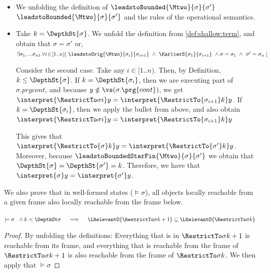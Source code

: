 \begin{itemize}
\item

We unfolding the definition of $\leadstoBounded  {\Mtwo}  {\sigma}  {\sigma'}$  $\leadstoBounded  {\Mtwo}  {\sigma}  {\sigma'}$ and the rules of the operational semantics. 
\item
Take $k=\DepthSt {\sigma}$.
We unfold the definition from \ref{def:shallow:term}, and obtain that
$\sigma = \sigma'$ or, $\exists \sigma_1,...\sigma_{n1}.\forall i\!\in\! [1..n)[\  \leadstoOrig {\Mtwo}  {\sigma_i}  {\sigma_{i+1}}\  \wedge\  \EarlierS{\sigma_1} {\sigma_{i+1}}\ \wedge \sigma=\sigma_1\ \wedge\ \sigma'=\sigma_n  \ ]$

Consider the second case. 
Take any  $i\!\in\! [1..n)$. Then, by Definition, $k \leq \DepthSt {\sigma}$. 
If $k= \DepthSt {\sigma_i}$, then we are executing part of $\sigma.prg{cont}$, and because 
 $y\notin \vs(\sigma.\prg{cont})$, we get $\interpret {\RestrictTo \sigma i} y =  \interpret {\RestrictTo {\sigma_{i+1}} k} y$.
 If $k= \DepthSt {\sigma_i}$, then we apply the bullet from above, and also obtain 
 $\interpret {\RestrictTo \sigma i} y =  \interpret {\RestrictTo {\sigma_{i+1}} k} y$
 
 This gives that  $\interpret {\RestrictTo {\sigma} k} y= \interpret {\RestrictTo {\sigma'} k} y$.
 Moreover, because   $\leadstoBoundedStarFin {\Mtwo}  {\sigma}  {\sigma'}$  we obtain that
 $\DepthSt {\sigma} = \DepthSt {\sigma'} = k$.
 Therefore, we have that  $\interpret   {\sigma} y= \interpret   {\sigma'} y$.
 
 \end{itemize}
 \completeProof

\vspace{1cm}


 We also prove that in well-formed states ($\models \sigma$), all objects locally reachable from a given frame also locally reachable from the frame below.
 
\begin{lemma}
\label{rel:smaller}
  $\models \sigma\ \  \wedge k< \DepthSt \sigma\ \ \  \ \Longrightarrow\ \ \  \ \LRelevantO   {\RestrictTo \sigma {k+1}} \subseteq \LRelevantO  {\RestrictTo \sigma {k}}$
\end{lemma}

\begin{proof}
By unfolding the definitions: Everything that is in $ \RestrictTo \sigma {k+1}$ is reachable from its frame, and everything that is reachable from the frame of  $ \RestrictTo \sigma {k+1}$ is also reachable from the frame of  $ \RestrictTo \sigma {k}$. We then apply that $\models \sigma$
 
\end{proof}


